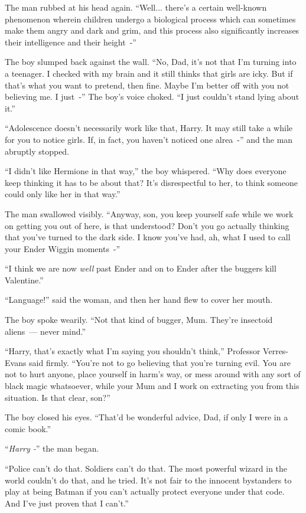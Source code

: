 The man rubbed at his head again. ``Well... there's a certain well-known phenomenon wherein children undergo a biological process which can sometimes make them angry and dark and grim, and this process also significantly increases their intelligence and their height~-''

The boy slumped back against the wall. ``No, Dad, it's not that I'm turning into a teenager. I checked with my brain and it still thinks that girls are icky. But if that's what you want to pretend, then fine. Maybe I'm better off with you not believing me. I just~-'' The boy's voice choked. ``I just couldn't stand lying about it.''

``Adolescence doesn't necessarily work like that, Harry. It may still take a while for you to notice girls. If, in fact, you haven't noticed one alrea~-'' and the man abruptly stopped.

``I didn't like Hermione in that way,'' the boy whispered. ``Why does everyone keep thinking it has to be about that? It's disrespectful to her, to think someone could only like her in that way.''

The man swallowed visibly. ``Anyway, son, you keep yourself safe while we work on getting you out of here, is that understood? Don't you go actually thinking that you've turned to the dark side. I know you've had, ah, what I used to call your Ender Wiggin moments~-''

``I think we are now \emph{well} past Ender and on to Ender after the buggers kill Valentine.''

``Language!'' said the woman, and then her hand flew to cover her mouth.

The boy spoke wearily. ``Not that kind of bugger, Mum. They're insectoid aliens~--- never mind.''

``Harry, that's exactly what I'm saying you shouldn't think,'' Professor Verres-Evans said firmly. ``You're not to go believing that you're turning evil. You are not to hurt anyone, place yourself in harm's way, or mess around with any sort of black magic whatsoever, while your Mum and I work on extracting you from this situation. Is that clear, son?''

The boy closed his eyes. ``That'd be wonderful advice, Dad, if only I were in a comic book.''

``\emph{Harry -}'' the man began.

``Police can't do that. Soldiers can't do that. The most powerful wizard in the world couldn't do that, and he tried. It's not fair to the innocent bystanders to play at being Batman if you can't actually protect everyone under that code. And I've just proven that I can't.''

